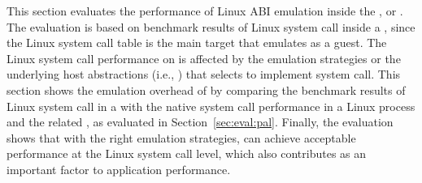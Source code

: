 This section evaluates the performance
of Linux ABI emulation
inside the \graphene{} \libos{},
or \thelibos{}.
The evaluation is based on benchmark results
of Linux system call inside a \picoproc{},
since the Linux system call table is the main target that \thelibos{} emulates
as a guest.
The Linux system call performance
on \thelibos{}
is affected by the emulation strategies
or the underlying host abstractions (i.e., \hostapis{})
that \thelibos{}
selects to implement system call.
This section
shows the emulation overhead of \thelibos{}
by comparing the benchmark results
of Linux system call in a \picoproc{} with the native system call performance in a Linux process
and the related \hostapis{}, as evaluated in Section~\ref{sec:eval:pal}.
Finally,
the evaluation shows that with the right emulation strategies,
\thelibos{} can achieve acceptable performance at the Linux system call level,
which also contributes as an important factor to
application performance.





